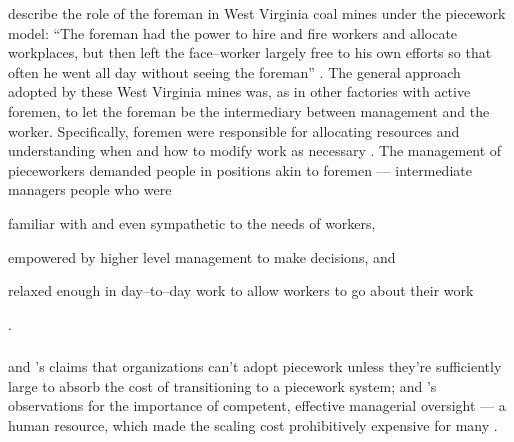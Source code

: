 \documentclass[trackingWork]{subfiles}
\begin{document}
\citeauthor{10.2307/2118435} describe the role of the foreman in West Virginia coal mines under the piecework model:
``The foreman had the power to hire and fire workers and allocate workplaces,
but then left the face--worker largely free to his own efforts so that
often he went all day without seeing the foreman''
\cite{10.2307/2118435}.
The general approach adopted by these West Virginia mines was,
as in other factories with active foremen,
to let the foreman be the intermediary between management and the worker.
Specifically, foremen were responsible for allocating resources and
understanding when and how to modify work as necessary
\cite{wray1949marginal}.
The management of pieceworkers %
demanded people in positions akin to foremen
--- intermediate managers people who were
\begin{inlinelist}
  \item familiar with and even sympathetic to the needs of workers,
  \item empowered by higher level management to make decisions, and
  \item relaxed enough in day--to--day work to allow workers to go about their work
\end{inlinelist}
\cite{wray1949marginal,10.2307/2118435}.



\subsubsection{\whatchanged}
\citeauthor{Brown01041990} and \citeauthor{10.2307/23702539}'s claims that
organizations can't adopt piecework unless
they're sufficiently large to absorb the cost of transitioning to a piecework system;
\citeauthor{10.2307/2118435} and \citeauthor{wray1949marginal}'s observations for
the importance of competent, effective managerial oversight
--- a human resource, which made the scaling cost prohibitively expensive for many
\cite{10.2307/2118435,wray1949marginal,10.2307/23702539,Brown01041990}.
\end{document}
